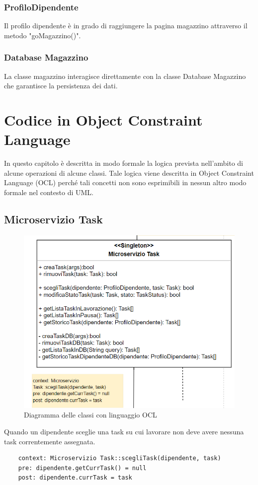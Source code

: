 \documentclass{report}
\begin{document}
\subsection*{ProfiloDipendente}

Il profilo dipendente è in grado di raggiungere la pagina magazzino attraverso il metodo "goMagazzino()".

\subsection*{Database Magazzino}

La classe magazzino interagisce direttamente con la classe Database Magazzino che garantisce la persistenza dei dati.







\chapter{Codice in Object Constraint Language}	
In questo capitolo è descritta in modo formale la logica prevista nell’ambito di alcune operazioni di alcune classi.
Tale logica viene descritta in Object Constraint Language (OCL) perché tali concetti non sono esprimibili in nessun altro modo formale nel contesto di UML.	
\section{Microservizio Task}
\begin{figure}[H]
	\centering\includegraphics[width=1\textwidth]{images/OCL/OCL_task.png}
	Diagramma delle classi con linguaggio OCL 
\end{figure}
Quando un dipendente sceglie una task su cui lavorare non deve avere nessuna task correntemente assegnata.
\begin{verbatim}
	context: Microservizio Task::scegliTask(dipendente, task)
	pre: dipendente.getCurrTask() = null
	post: dipendente.currTask = task

\end{verbatim}
\end{document}
